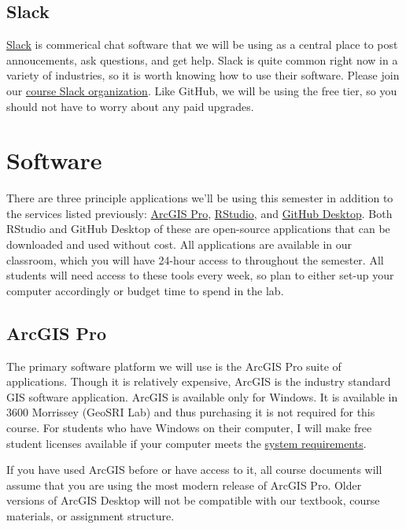 \documentclass[]{book}
\begin{document}
\hypertarget{slack}{%
\subsection{Slack}\label{slack}}

\href{http://slack.com}{Slack} is commerical chat software that we will be using as a central place to post annoucements, ask questions, and get help. Slack is quite common right now in a variety of industries, so it is worth knowing how to use their software. Please join our \href{http://slu-soc5650.slack.com}{course Slack organization}. Like GitHub, we will be using the free tier, so you should not have to worry about any paid upgrades.

\hypertarget{software}{%
\section{Software}\label{software}}

There are three principle applications we'll be using this semester in addition to the services listed previously: \href{https://pro.arcgis.com/en/pro-app/}{ArcGIS Pro}, \href{https://www.rstudio.com}{RStudio}, and \href{https://desktop.github.com}{GitHub Desktop}. Both RStudio and GitHub Desktop of these are open-source applications that can be downloaded and used without cost. All applications are available in our classroom, which you will have 24-hour access to throughout the semester. All students will need access to these tools every week, so plan to either set-up your computer accordingly or budget time to spend in the lab.

\hypertarget{arcgis-pro}{%
\subsection{ArcGIS Pro}\label{arcgis-pro}}

The primary software platform we will use is the ArcGIS Pro suite of applications. Though it is relatively expensive, ArcGIS is the industry standard GIS software application. ArcGIS is available only for Windows. It is available in 3600 Morrissey (GeoSRI Lab) and thus purchasing it is not required for this course. For students who have Windows on their computer, I will make free student licenses available if your computer meets the \href{http://pro.arcgis.com/en/pro-app/get-started/arcgis-pro-system-requirements.htm}{system requirements}.

If you have used ArcGIS before or have access to it, all course documents will assume that you are using the most modern release of ArcGIS Pro. Older versions of ArcGIS Desktop will not be compatible with our textbook, course materials, or assignment structure.
\end{document}
